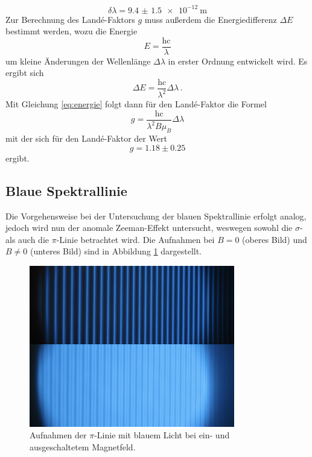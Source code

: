 \begin{equation*}
    \delta \lambda = \SI{9.4(15)e-12}{\meter}
\end{equation*}
Zur Berechnung des Landé-Faktors $g$ muss außerdem die Energiedifferenz $\Delta E$ bestimmt werden, wozu die Energie
\begin{equation*}
    E = \frac{\text{hc}}{\lambda}
\end{equation*} 
um kleine Änderungen der Wellenlänge $\Delta \lambda$ in erster Ordnung entwickelt wird. Es ergibt sich
\begin{equation*}
    \Delta E = \frac{\text{hc}}{\lambda^2} \Delta \lambda \, .
\end{equation*}
Mit Gleichung \eqref{eq:energie} folgt dann für den Landé-Faktor die Formel 
\begin{equation} 
    \label{eq:landee}
    g = \frac{\text{hc}}{\lambda^2 B \mu_B} \Delta \lambda
\end{equation}
mit der sich für den Landé-Faktor der Wert
\begin{equation*}
    g = 1.18 \pm 0.25
\end{equation*}
ergibt.

\subsection{Blaue Spektrallinie}
Die Vorgehensweise bei der Untersuchung der blauen Spektrallinie erfolgt analog, jedoch wird nun der anomale Zeeman-Effekt
untersucht, weswegen sowohl die $\sigma$- als auch die $\pi$-Linie betrachtet wird. 
Die Aufnahmen bei $B = 0$ (oberes Bild) und $B \neq 0$ (unteres Bild) sind in Abbildung \ref{fig:afig3} dargestellt.
\FloatBarrier
\begin{figure}
    \centering
    \includegraphics[width=0.8\textwidth]{pi.jpg}
    \caption{Aufnahmen der $\pi$-Linie mit blauem Licht bei ein- und ausgeschaltetem Magnetfeld.}
    \label{fig:afig3}
\end{figure}
\FloatBarrier
